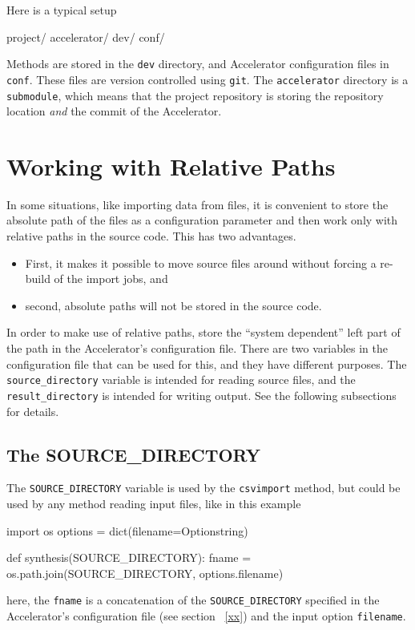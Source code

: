 Here is a typical setup
\begin{shell}
project/
    accelerator/
    dev/
    conf/
\end{shell}
Methods are stored in the \texttt{dev} directory, and Accelerator
configuration files in \texttt{conf}.  These files are version
controlled using \texttt{git}.  The \texttt{accelerator} directory is
a \texttt{submodule}, which means that the project repository is
storing the repository location \textsl{and} the commit of the
Accelerator.


\clearpage

\section{Working with Relative Paths}

In some situations, like importing data from files, it is convenient
to store the absolute path of the files as a configuration parameter
and then work only with relative paths in the source code.  This has
two advantages.
\begin{itemize}
\item[] First, it makes it possible to move source files around without
forcing a re-build of the import jobs, and
\item[] second, absolute paths will not be stored in the source code.
\end{itemize}
In order to make use of relative paths, store the ``system dependent''
left part of the path in the Accelerator's configuration file.  There
are two variables in the configuration file that can be used for this,
and they have different purposes.  The \texttt{source\_directory}
variable is intended for reading source files, and
the \texttt{result\_directory} is intended for writing output.  See
the following subsections for details.


\subsection{The SOURCE\_DIRECTORY}
The \texttt{SOURCE\_DIRECTORY} variable is used by
the \texttt{csvimport} method, but could be used by any method reading
input files, like in this example
\begin{python}
import os
options = dict(filename=Optionstring)

def synthesis(SOURCE_DIRECTORY):
    fname = os.path.join(SOURCE_DIRECTORY, options.filename)
\end{python}
here, the \texttt{fname} is a concatenation of
the \texttt{SOURCE\_DIRECTORY} specified in the Accelerator's
configuration file (see section ~\ref{xx}) and the input
option \texttt{filename}.


